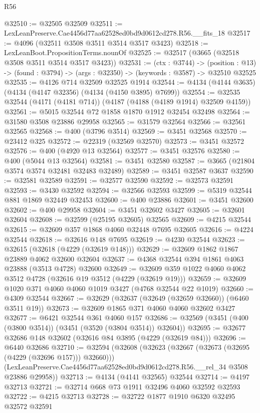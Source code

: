\begin{lexlean}{R56}
\begin{coremodule}
@32510 := @32505 @32509
@32511 := LexLeanPreserve.Cae4456d77aa62528ed0bd9d0612cd278.R56.__fits_18
@32517 := @4096 (@32511 @3508 @3511 @3514 @3517 @3423)
@32518 := LexLeanBoot.PropositionTerms.nounOf
@32525 := @32517 (@3665 (@32518 @3508 @3511 @3514 @3517 @3423))
@32531 := (ctx : @3744) ->
  (position : @13) -> (found : @3794) -> (args : @32350) -> (keywords : @3587) -> @32510 @32525
@32535 := @4126 @714 @32509 @32525 @1914
@32544 := @4134 (@4144 @3635) (@4134 (@4147 @32356) (@4134 (@4150 @3895) @7699))
@32554 := @32535 @32544 (@4171 (@4181 @714)) (@4187 (@4188 (@4189 @1914) @32509 @4159))
@32561 := @5015 @32544 @72 @1858 @1870 @1912 @32454 @32498
@32564 := @31580 @3508 @23886 @29958
@32565 := @31579 @32564
@32566 := @32561 @32565
@32568 := @400 (@3796 @3514)
@32569 := @3451 @32568
@32570 := @23412 @325
@32572 := @22319 (@32569 @32570)
@32573 := @3451 @32572
@32576 := @400 (@4920 @13 @32564)
@32577 := @3451 @32576
@32580 := @400 (@5044 @13 @32564)
@32581 := @3451 @32580
@32587 := @3665 (@21804 @3574 @3574 @32481 @32483 @32489)
@32589 := @3451 @32587 @3637
@32590 := @32581 @32589
@32591 := @32577 @32590
@32592 := @32573 @32591
@32593 := @3430 @32592
@32594 := @32566 @32593
@32599 := @5319 @32544 @881 @1869 @32449 @32453
@32600 := @400 @23886
@32601 := @3451 @32600
@32602 := @400 @29958
@32604 := @3451 @32602 @3427
@32605 := @32601 @32604
@32608 := @32599 (@25195 @32605) @32565
@32609 := @4215 @32544
@32615 := @32609 @357 @1868 @4060 @32448 @7695 @32605
@32616 := @4224 @32544
@32618 := @32616 @148 @7695
@32619 := @4230 @32544
@32623 := @32615 (@32618 (@4229 (@32619 @148)))
@32629 := @32609 @1862 @1867 @23889 @4062 @32600 @32604
@32637 := @4368 @32544 @394 @1861 @4063 @23888 (@3513 @4728) @32600
@32649 := @32609 @359 @1022 @4060 @4062 @3512 @4728 (@32616 @19 @3512 (@4229 (@32619 @19)))
@32659 := @32609 @1020 @371 @4060 @4060 @1019 @3427 (@4768 @32544 @22 @1019)
@32660 := @4309 @32544
@32667 := @32629 (@32637 (@32649 (@32659 @32660)) (@6460 @3511 @19))
@32673 := @32609 @1865 @371 @4060 @4060 @32602 @3427
@32677 := @6421 @32544 @361 @4060 @157
@32686 := @32569 (@3451 (@400 (@3800 @3514)) (@3451 (@3520 (@3804 @3514)) @32604))
@32695 := @32677 @32686 @148 @32602 (@32616 @84 @3895 (@4229 (@32619 @84)))
@32696 := @6440 @32686
@32710 := @32594
    (@32608
      (@32623 (@32667 (@32673 (@32695 (@4229 (@32696 @157))) @32660)))
      (LexLeanPreserve.Cae4456d77aa62528ed0bd9d0612cd278.R56.__rel_34 @3508 @23886 @29958))
@32713 := @4134 (@4141 @32565) @32544
@32714 := @4197 @32713
@32721 := @32714 @668 @73 @1911 @32496 @4060 @32592 @32593
@32722 := @4215 @32713
@32728 := @32722 @1877 @1910 @6320 @32495 @32572 @32591

\end{coremodule}
\end{lexlean}
